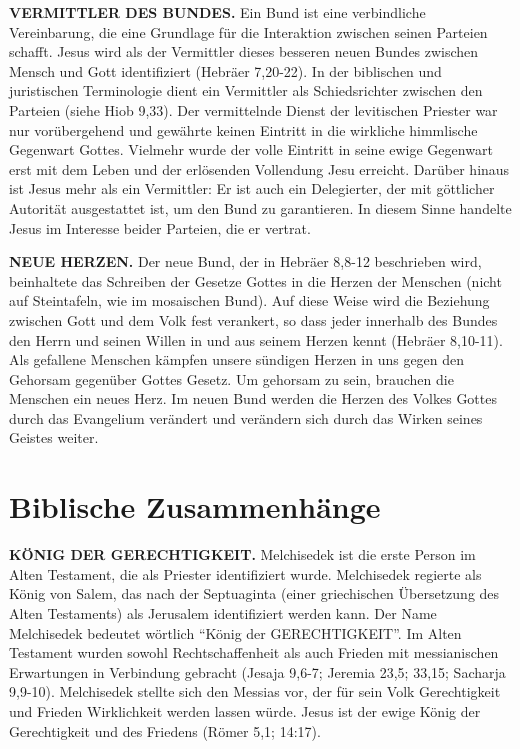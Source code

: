 \documentclass[
  12pt,
]{krantz}
\begin{document}
\textbf{VERMITTLER DES BUNDES.} Ein Bund ist eine verbindliche Vereinbarung, die eine Grundlage für die Interaktion zwischen seinen Parteien schafft. Jesus wird als der Vermittler dieses besseren neuen Bundes zwischen Mensch und Gott identifiziert (Hebräer 7,20-22). In der biblischen und juristischen Terminologie dient ein Vermittler als Schiedsrichter zwischen den Parteien (siehe Hiob 9,33). Der vermittelnde Dienst der levitischen Priester war nur vorübergehend und gewährte keinen Eintritt in die wirkliche himmlische Gegenwart Gottes. Vielmehr wurde der volle Eintritt in seine ewige Gegenwart erst mit dem Leben und der erlösenden Vollendung Jesu erreicht. Darüber hinaus ist Jesus mehr als ein Vermittler: Er ist auch ein Delegierter, der mit göttlicher Autorität ausgestattet ist, um den Bund zu garantieren. In diesem Sinne handelte Jesus im Interesse beider Parteien, die er vertrat.

\textbf{NEUE HERZEN.} Der neue Bund, der in Hebräer 8,8-12 beschrieben wird, beinhaltete das Schreiben der Gesetze Gottes in die Herzen der Menschen (nicht auf Steintafeln, wie im mosaischen Bund). Auf diese Weise wird die Beziehung zwischen Gott und dem Volk fest verankert, so dass jeder innerhalb des Bundes den Herrn und seinen Willen in und aus seinem Herzen kennt (Hebräer 8,10-11). Als gefallene Menschen kämpfen unsere sündigen Herzen in uns gegen den Gehorsam gegenüber Gottes Gesetz. Um gehorsam zu sein, brauchen die Menschen ein neues Herz. Im neuen Bund werden die Herzen des Volkes Gottes durch das Evangelium verändert und verändern sich durch das Wirken seines Geistes weiter.

\hypertarget{biblische-zusammenhuxe4nge}{%
\section{Biblische Zusammenhänge}\label{biblische-zusammenhuxe4nge}}

\textbf{KÖNIG DER GERECHTIGKEIT.} Melchisedek ist die erste Person im Alten Testament, die als Priester identifiziert wurde. Melchisedek regierte als König von Salem, das nach der Septuaginta (einer griechischen Übersetzung des Alten Testaments) als Jerusalem identifiziert werden kann. Der Name Melchisedek bedeutet wörtlich ``König der GERECHTIGKEIT''. Im Alten Testament wurden sowohl Rechtschaffenheit als auch Frieden mit messianischen Erwartungen in Verbindung gebracht (Jesaja 9,6-7; Jeremia 23,5; 33,15; Sacharja 9,9-10). Melchisedek stellte sich den Messias vor, der für sein Volk Gerechtigkeit und Frieden Wirklichkeit werden lassen würde. Jesus ist der ewige König der Gerechtigkeit und des Friedens (Römer 5,1; 14:17).
\end{document}
